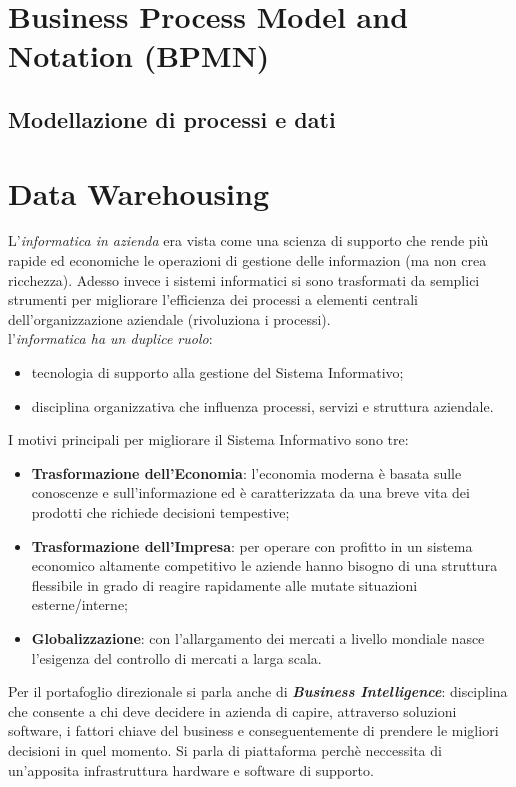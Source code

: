 \documentclass[a4paper, notitlepage, 9pt]{extreport}
\begin{document}
\chapter*{Business Process Model and Notation (BPMN)}


\section*{Modellazione di processi e dati}



\chapter*{Data Warehousing}
L'\textit{informatica in azienda} era vista come una scienza di supporto che rende più rapide ed economiche le operazioni di gestione delle informazion (ma non crea ricchezza). Adesso invece i sistemi informatici si sono trasformati da semplici strumenti per migliorare l'efficienza dei processi a elementi centrali dell'organizzazione aziendale (rivoluziona i processi).\\
l'\textit{informatica ha un duplice ruolo}: 
\begin{itemize}
	\item tecnologia di supporto alla gestione del Sistema Informativo;
	\item disciplina organizzativa che influenza processi, servizi e struttura aziendale.
\end{itemize}
I motivi principali per migliorare il Sistema Informativo sono tre:
\begin{itemize}
	\item \textbf{Trasformazione dell'Economia}: l’economia moderna è basata sulle conoscenze e sull'informazione ed è caratterizzata da una breve vita dei prodotti che richiede decisioni tempestive;
	\item \textbf{Trasformazione dell'Impresa}: per operare con profitto in un sistema economico altamente competitivo le aziende hanno bisogno di una struttura flessibile in grado di reagire rapidamente alle mutate situazioni esterne/interne;
	\item \textbf{Globalizzazione}: con l’allargamento dei mercati a livello mondiale nasce l’esigenza del controllo di mercati a larga scala.
\end{itemize}
Per il portafoglio direzionale si parla anche di \textbf{\textit{Business Intelligence}}: disciplina che consente a chi deve decidere in azienda di capire, attraverso soluzioni software, i fattori chiave del business e conseguentemente di prendere le migliori decisioni in quel momento. Si parla di piattaforma perchè neccessita di un'apposita infrastruttura hardware e software di supporto.\\
\end{document}
